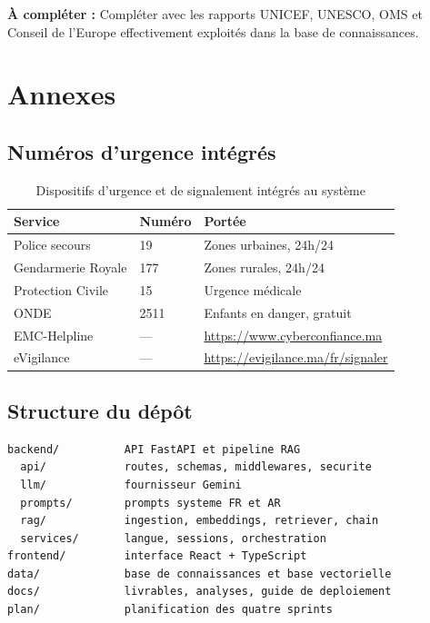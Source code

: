 \documentclass[a4paper,11pt,twoside]{report}
\newcommand{\todo}[1]{%
  \begin{tcolorbox}[colback=yellow!12,colframe=orange!70!black,left=4pt,right=4pt,top=3pt,bottom=3pt]
  \small\textbf{À compléter :} #1
  \end{tcolorbox}}
\begin{document}
\todo{Compléter avec les rapports UNICEF, UNESCO, OMS et Conseil de l'Europe
effectivement exploités dans la base de connaissances.}

\appendix
\chapter{Annexes}

\section{Numéros d'urgence intégrés}

\begin{table}[htbp]
\centering
\small
\begin{tabular}{@{}llp{5.6cm}@{}}
\toprule
\textbf{Service} & \textbf{Numéro} & \textbf{Portée} \\
\midrule
Police secours          & 19   & Zones urbaines, 24h/24 \\
Gendarmerie Royale      & 177  & Zones rurales, 24h/24 \\
Protection Civile       & 15   & Urgence médicale \\
ONDE                    & 2511 & Enfants en danger, gratuit \\
EMC-Helpline            & ---  & \url{https://www.cyberconfiance.ma} \\
eVigilance              & ---  & \url{https://evigilance.ma/fr/signaler} \\
\bottomrule
\end{tabular}
\caption{Dispositifs d'urgence et de signalement intégrés au système}
\label{tab:urgence}
\end{table}

\section{Structure du dépôt}

\begin{lstlisting}[language=bash,caption={Organisation des sources},label={lst:arbo}]
backend/          API FastAPI et pipeline RAG
  api/            routes, schemas, middlewares, securite
  llm/            fournisseur Gemini
  prompts/        prompts systeme FR et AR
  rag/            ingestion, embeddings, retriever, chain
  services/       langue, sessions, orchestration
frontend/         interface React + TypeScript
data/             base de connaissances et base vectorielle
docs/             livrables, analyses, guide de deploiement
plan/             planification des quatre sprints
\end{lstlisting}
\end{document}
